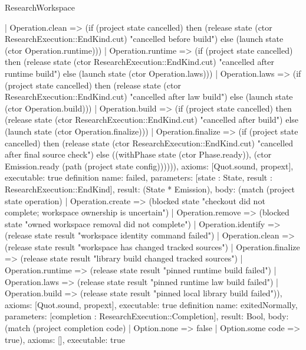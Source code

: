 \begin{lexlean}{ResearchWorkspace}
\begin{semanticmodule}
{ | Operation.clean => (if (project state cancelled) then (release state (ctor ResearchExecution::EndKind.cut) "cancelled before build") else (launch state (ctor Operation.runtime)))
 | Operation.runtime => (if (project state cancelled) then (release state (ctor ResearchExecution::EndKind.cut) "cancelled after runtime build") else (launch state (ctor Operation.laws)))
 | Operation.laws => (if (project state cancelled) then (release state (ctor ResearchExecution::EndKind.cut) "cancelled after law build") else (launch state (ctor Operation.build)))
 | Operation.build => (if (project state cancelled) then (release state (ctor ResearchExecution::EndKind.cut) "cancelled after build") else (launch state (ctor Operation.finalize)))
 | Operation.finalize => (if (project state cancelled) then (release state (ctor ResearchExecution::EndKind.cut) "cancelled after final source check") else ((withPhase state (ctor Phase.ready)), (ctor Emission.ready (path (project state config)))))),
 axioms: [Quot.sound, propext],
 executable: true
}
definition{
 name: failed,
 parameters: [state : State, result : ResearchExecution::EndKind],
 result: (State * Emission),
 body: (match (project state operation)
 | Operation.create => (blocked state "checkout did not complete; workspace ownership is uncertain")
 | Operation.remove => (blocked state "owned workspace removal did not complete")
 | Operation.identify => (release state result "workspace identity command failed")
 | Operation.clean => (release state result "workspace has changed tracked sources")
 | Operation.finalize => (release state result "library build changed tracked sources")
 | Operation.runtime => (release state result "pinned runtime build failed")
 | Operation.laws => (release state result "pinned runtime law build failed")
 | Operation.build => (release state result "pinned local library build failed")),
 axioms: [Quot.sound, propext],
 executable: true
}
definition{
 name: exitedNormally,
 parameters: [completion : ResearchExecution::Completion],
 result: Bool,
 body: (match (project completion code) | Option.none => false | Option.some code => true),
 axioms: [],
 executable: true
}


\end{semanticmodule}
\end{lexlean}
